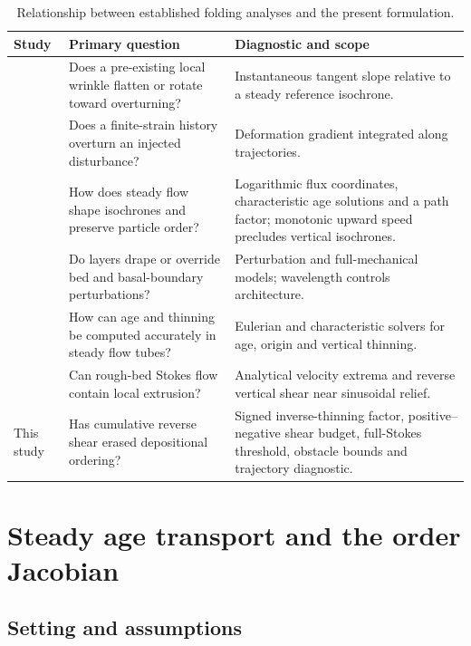 \documentclass[review]{igs}
\newcommand{\textcite}{\citet}
\theoremstyle{definition}
\theoremstyle{remark}
\begin{document}
\begin{table}[t]
\centering
\caption{Relationship between established folding analyses and the present formulation.}
\label{tab:lineage}
\small
\begin{tabularx}{\textwidth}{@{}>{\raggedright\arraybackslash}p{}>{\raggedright\arraybackslash}X>{\raggedright\arraybackslash}X@{}}
\toprule
Study & Primary question & Diagnostic and scope \\
\midrule
\textcite{Waddington2001} & Does a pre-existing local wrinkle flatten or rotate toward overturning? & Instantaneous tangent slope relative to a steady reference isochrone. \\
\midrule
\textcite{JacobsonWaddington2004} & Does a finite-strain history overturn an injected disturbance? & Deformation gradient integrated along trajectories. \\
\midrule
\textcite{ParreninHindmarshRemy2006,ParreninHindmarsh2007} & How does steady flow shape isochrones and preserve particle order? & Logarithmic flux coordinates, characteristic age solutions and a path factor; monotonic upward speed precludes vertical isochrones. \\
\midrule
\textcite{Hindmarsh2006} & Do layers drape or override bed and basal-boundary perturbations? & Perturbation and full-mechanical models; wavelength controls architecture. \\
\midrule
\textcite{HindmarshLeysingerVieliParrenin2009,ParreninChungMartin2025} & How can age and thinning be computed accurately in steady flow tubes? & Eulerian and characteristic solvers for age, origin and vertical thinning. \\
\midrule
\textcite{Gudmundsson1997linear} & Can rough-bed Stokes flow contain local extrusion? & Analytical velocity extrema and reverse vertical shear near sinusoidal relief. \\
\midrule
This study & Has cumulative reverse shear erased depositional ordering? & Signed inverse-thinning factor, positive--negative shear budget, full-Stokes threshold, obstacle bounds and trajectory diagnostic. \\
\bottomrule
\end{tabularx}
\end{table}

\section{Steady age transport and the order Jacobian}

\subsection{Setting and assumptions}
\end{document}
